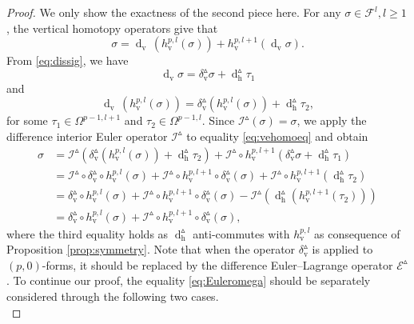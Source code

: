 \documentclass[11pt]{article} %
\numberwithin{equation}{section}
\newcommand{\upd}{\operatorname{d}}
\newcommand{\uph}{\operatorname{h}}
\newcommand{\upv}{\operatorname{v}}
\newcommand{\dv}{\upd_{\upv}\!}
\newcommand{\mcE}{\mathcal{E}}
\newcommand{\mcI}{\mathcal{I}}
\newcommand{\dDh}{\upd^{\vartriangle}_{\uph}}
\theoremstyle{plain}
\theoremstyle{definition}
\begin{document}
\begin{proof}
We only show the exactness of the second piece here. For any
$\sigma\in\mathscr{F}^l,l\geq1$, the vertical homotopy
operators give that 
\begin{equation}\label{eq:vehomoeq}
\sigma=\dv\,(h_{\upv}^{p,l}(\sigma))
+h_{\upv}^{p,l+1}(\dv \sigma).
\end{equation}
From \eqref{eq:dissig}, we have
\begin{equation}
\dv \sigma=\delta^{\vartriangle}_{\upv}\sigma
+\dDh\!\tau_1
\end{equation}
and
\begin{equation}
\dv\,(h_{\upv}^{p,l}(\sigma))=\delta^{\vartriangle}_{\upv}
(h_{\upv}^{p,l}(\sigma))+\dDh\!\tau_2,
\end{equation}
for some $\tau_1\in\Omega^{p-1,l+1}$ and $\tau_2\in\Omega^{p-1,l}$.
Since $\mcI^{\vartriangle}(\sigma)=\sigma$, we apply the
difference interior Euler operator $\mcI^{\vartriangle}$ to
equality \eqref{eq:vehomoeq} and obtain 
\begin{equation}\label{eq:Euleromega}
\begin{aligned}
\sigma&=\mcI^{\vartriangle}\left(\delta^{\vartriangle}_{\upv}
(h_{\upv}^{p,l}(\sigma))+\dDh\!\tau_2\right)+
\mcI^{\vartriangle}\circ
h_{\upv}^{p,l+1}\left(\delta^{\vartriangle}_{\upv}\sigma
+\dDh\!\tau_1\right)\\
&=\mcI^{\vartriangle}\circ\delta^{\vartriangle}_{\upv}\circ
h_{\upv}^{p,l}(\sigma) +\mcI^{\vartriangle}\circ
h_{\upv}^{p,l+1}\circ\delta^{\vartriangle}_{\upv}(\sigma)
+\mcI^{\vartriangle}\circ h_{\upv}^{p,l+1}(\dDh\!\tau_2)\\
&=\delta^{\vartriangle}_{\upv}\circ
h_{\upv}^{p,l}(\sigma) +\mcI^{\vartriangle}\circ
h_{\upv}^{p,l+1}\circ\delta^{\vartriangle}_{\upv}(\sigma)
-\mcI^{\vartriangle}\left(\dDh\left( h_{\upv}^{p,l+1}(\tau_2)\right)\right)\\
&=\delta^{\vartriangle}_{\upv}\circ
h_{\upv}^{p,l}(\sigma) +\mcI^{\vartriangle}\circ
h_{\upv}^{p,l+1}\circ\delta^{\vartriangle}_{\upv}(\sigma),
\end{aligned}
\end{equation}
where the third equality holds as
$\dDh$ anti-commutes
with $h_{\upv}^{p,l}$ as consequence of Proposition
\ref{prop:symmetry}. Note that when the operator
$\delta^{\vartriangle}_{\upv}$ is applied to
$(p,0)$-forms, it should be replaced by the difference
Euler--Lagrange operator $\mcE^{\vartriangle}$. To continue
 our proof, the equality \eqref{eq:Euleromega} should be separately
considered through the following two
cases.\\

\end{proof}
\end{document}
